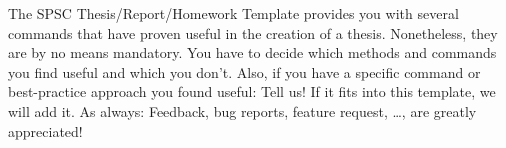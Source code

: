 \tableofcontents

{
\emptydoublepage
\setcounter{mypageno}{\value{page}}
\mainmatter \pagestyle{scrheadings} 
\setcounter{page}{\value{mypageno}}
}



The SPSC Thesis/Report/Homework Template provides you with several commands that have proven useful in the creation of a thesis. Nonetheless, they are by no means mandatory. You have to decide which methods and commands you find useful and which you don't. Also, if you have a specific command or best-practice approach you found useful: Tell us! If it fits into this template, we will add it. As always: Feedback, bug reports, feature request, \dots, are greatly appreciated! 











\appendix
{}
{
\setcounter{mypageno}{\value{page}}
\frontmatter \pagestyle{plain} 
\setcounter{page}{\value{mypageno}}
}{}

\printbibliography[title=References]
\listoffigures
\listoftables
\printglossary[type=\acronymtype]

% 
% 



\FloatBarrier\label{end-of-document}


